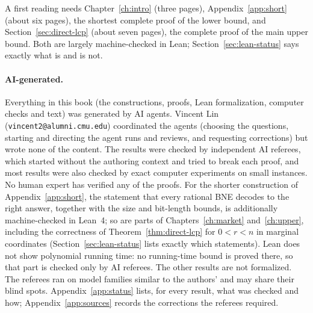 A first reading needs Chapter~\ref{ch:intro} (three pages), Appendix~\ref{app:short} (about six pages), the shortest complete proof of the lower bound, and Section~\ref{sec:direct-lcp} (about seven pages), the complete proof of the main upper bound. Both are largely machine-checked in Lean; Section~\ref{sec:lean-status} says exactly what is and is not.

\paragraph{AI-generated.} Everything in this book (the constructions, proofs, Lean formalization, computer checks and text) was generated by AI agents. Vincent Lin (\texttt{vincent2@alumni.cmu.edu}) coordinated the agents (choosing the questions, starting and directing the agent runs and reviews, and requesting corrections) but wrote none of the content. The results were checked by independent AI referees, which started without the authoring context
and tried to break each proof, and most results were also checked by exact computer experiments on
small instances. No human expert has verified any of the proofs. For the shorter construction of Appendix~\ref{app:short}, the statement that every rational BNE decodes to the right answer, together with the size and bit-length bounds, is additionally machine-checked in Lean~4; so are parts of Chapters~\ref{ch:market} and~\ref{ch:upper}, including the correctness of Theorem~\ref{thm:direct-lcp} for $0<r<n$ in marginal coordinates (Section~\ref{sec:lean-status} lists exactly which statements). Lean does not show polynomial running time: no running-time bound is proved there, so that part is checked only by AI referees. The other results are not formalized. The referees ran on model families
similar to the authors' and may share their blind spots. Appendix~\ref{app:status} lists, for every
result, what was checked and how; Appendix~\ref{app:sources} records the corrections the referees
required.

